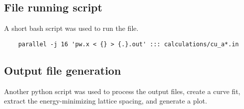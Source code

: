 \subsection{File running script}

A short bash script was used to run the file.

\begin{tcolorbox}[colback=gray!10, colframe=gray!30, boxrule=0.5pt, breakable]
\begin{center}
    \begin{verbatim}
    parallel -j 16 'pw.x < {} > {.}.out' ::: calculations/cu_a*.in
  \end{verbatim}
\end{center}
\end{tcolorbox}

\subsection{Output file generation}

Another python script was used to process the output files, create a
curve fit, extract the energy-minimizing lattice spacing, and generate
a plot.

\begin{tcolorbox}[colback=gray!10, colframe=gray!30, boxrule=0.5pt, breakable]
\begin{center}
  \inputminted[linenos,
  numbersep=8pt, fontsize=\small]{python}{./calculations/analyze_results.py}
\end{center}
\end{tcolorbox}


